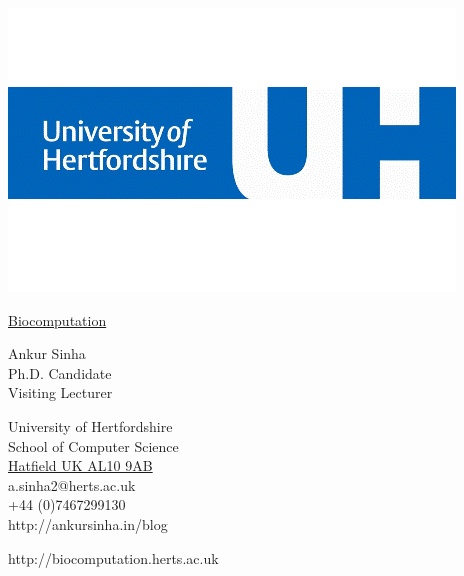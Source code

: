 \documentclass[9pt,a4paper]{memoir}
\begin{document}
\noindent
\begin{minipage}[c]{0.42\linewidth}
  \includegraphics[keepaspectratio,width=\textwidth]{UH-blue.png}
\end{minipage}
\begin{minipage}[c]{0.6\linewidth}
    \begin{raggedleft}
      \Huge{\selectfont \textcolor{uh-blue}{\underline{Biocomputation}}} \\
    \end{raggedleft}
\end{minipage}
\begin{Spacing}{1}
  \hspace*{-\parindent}%
  \begin{minipage}[c]{0.4\textwidth}
    \begin{raggedright}
    \LARGE{\textcolor{uh-blue}{Ankur Sinha}} \\
    \footnotesize{Ph.D. Candidate} \\
    \footnotesize{Visiting Lecturer} \\
    \end{raggedright}
  \end{minipage}
  \begin{minipage}[c]{0.6\textwidth}
    \begin{raggedleft}
      \small{University of Hertfordshire} \\
      \footnotesize{School of Computer Science} \\
      \footnotesize{\underline{Hatfield UK AL10 9AB}} \\
        \vspace{0.5mm}
      \footnotesize{a.sinha2@herts.ac.uk} \\
      \footnotesize{+44 (0)7467299130} \\
      \footnotesize{http://ankursinha.in/blog} \\
    \end{raggedleft}
  \end{minipage}
\end{Spacing}
\begin{center}
  \footnotesize{http://biocomputation.herts.ac.uk}
\end{center}
\end{document}
